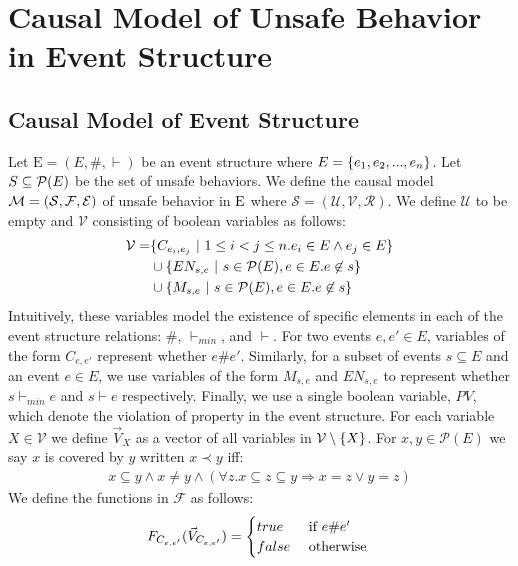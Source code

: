\section{Causal Model of Unsafe Behavior in Event Structure}

\subsection{Causal Model of Event Structure}
Let $\mathrm{E} = (E,\#,\vdash)$ be an event structure where
$E = \{e_1, e_2, ...,e_n\}$.
Let $S \subseteq \mathcal{P}(E)$ be the set of unsafe behaviors.
We define the causal model
$\mathcal{M} = (\mathcal{S},\mathcal{F},\mathcal{E})$ of unsafe behavior
in $\mathrm{E}$ where
$\mathcal{S} = (\mathcal{U},\mathcal{V},\mathcal{R})$.
We define $\mathcal{U}$ to be empty and $\mathcal{V}$
consisting of boolean variables as follows:
\begin{align*}
    \mathcal{V} = & \{C_{e_i,e_j} ~|~  1 \leq i < j \leq n.
    e_i \in E \wedge e_j \in E\}                                \\
                  & \cup \{EN_{s,e} ~|~ s \in \mathcal{P}(E),
    e \in E. e \not \in s \}                                    \\
                  & \cup \{M_{s,e} ~|~ s \in \mathcal{P}(E),
        e \in E. e \not \in s \}
\end{align*}
Intuitively, these variables model the existence of specific elements in
each of the event structure relations: $\#$, $\vdash_{min}$, and $\vdash$.
For two events $e,e' \in E$, variables of the form $C_{e,e'}$ represent whether $e\#e'$.
Similarly, for a subset of events $s \subseteq E$ and an event $e \in E$,
we use variables of the form $M_{s,e}$ and $EN_{s,e}$ to represent
whether $s \vdash_{min} e$ and $s \vdash e$ respectively.
Finally, we use a single boolean variable, $PV$, which denote the
violation of property in the event structure.
For each variable $X \in \mathcal{V}$ we define $\vec V_X$
as a vector of all variables in $\mathcal{V} \setminus \{X\}$.
For $x,y \in \mathcal{P}(E)$ we say $x$ is covered by $y$ written $ x \prec y$ iff:
\begin{align*}
    x \subseteq y \wedge x \neq y \wedge
    (\forall z. x \subseteq z \subseteq y \Rightarrow x = z
    \vee y = z)
\end{align*}
We define the functions in $\mathcal{F}$ as follows:
$$
    F_{C_{e,e'}}(\vec V_{C_{e,e'}}) = \begin{cases}
        true  & \text{ if } e \# e' \\
        false & \text{ otherwise }
    \end{cases}
$$
